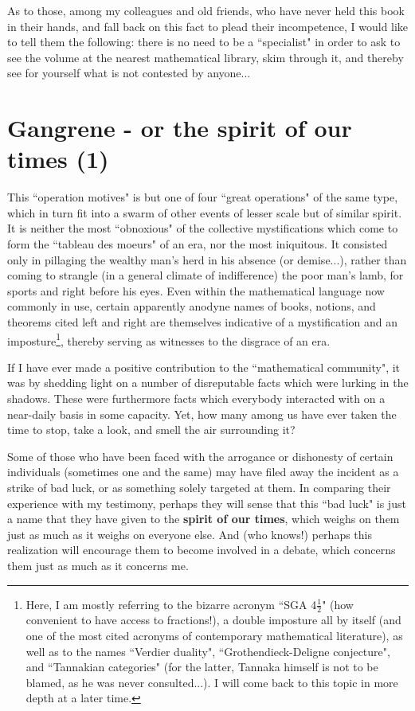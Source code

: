 As to those, among my colleagues and old friends, who have never held this book in their hands, and fall back on this fact to plead their incompetence, I would like to tell them the following: there is no need to be a ``specialist" in order to ask to see the volume at the nearest mathematical library, skim through it, and thereby see for yourself what is not contested by anyone...

\section{Gangrene - or the spirit of our times (1)}

This ``operation motives" is but one of four ``great operations" of the same type, which in turn fit into a swarm of other events of lesser scale but of similar spirit. It is neither the most ``obnoxious" of the collective mystifications which come to form the ``tableau des moeurs" of an era, nor the most iniquitous. It consisted only in pillaging the wealthy man's herd in his absence (or demise...), rather than coming to strangle (in a general climate of indifference) the poor man's lamb, for sports and right before his eyes. Even within the mathematical language now commonly in use, certain apparently anodyne names of books, notions, and theorems cited left and right are themselves indicative of a mystification and an imposture\footnote{Here, I am mostly referring to the bizarre acronym ``SGA 4$\frac{1}{2}$" (how convenient to have access to fractions!), a double imposture all by itself (and one of the most cited acronyms of contemporary mathematical literature), as well as to the names ``Verdier duality", ``Grothendieck-Deligne conjecture", and ``Tannakian categories" (for the latter, Tannaka himself is not to be blamed, as he was never consulted...). I will come back to this topic in more depth at a later time.}, thereby serving as witnesses to the disgrace of an era.

If I have ever made a positive contribution to the ``mathematical community", it was by shedding light on a number of disreputable facts which were lurking in the shadows. These were furthermore facts which everybody interacted with on a near-daily basis in some capacity. Yet, how many among us have ever taken the time to stop, take a look, and smell the air surrounding it?

Some of those who have been faced with the arrogance or dishonesty of certain individuals (sometimes one and the same) may have filed away the incident as a strike of bad luck, or as something solely targeted at them. In comparing their experience with my testimony, perhaps they will sense that this ``bad luck" is just a name that they have given to the \textbf{spirit of our times}, which weighs on them just as much as it weighs on everyone else. And (who knows!) perhaps this realization will encourage them to become involved in a debate, which concerns them just as much as it concerns me.

